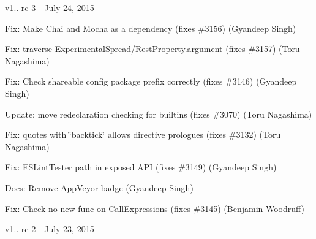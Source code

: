 v1..-\/rc-\/3 -\/ July 24, 2015


\begin{DoxyItemize}
\item Fix\+: Make Chai and Mocha as a dependency (fixes \#3156) (Gyandeep Singh)
\item Fix\+: traverse {\ttfamily Experimental\+Spread/\+Rest\+Property.\+argument} (fixes \#3157) (Toru Nagashima)
\item Fix\+: Check shareable config package prefix correctly (fixes \#3146) (Gyandeep Singh)
\item Update\+: move redeclaration checking for builtins (fixes \#3070) (Toru Nagashima)
\item Fix\+: {\ttfamily quotes} with {\ttfamily \char`\"{}backtick\char`\"{}} allows directive prologues (fixes \#3132) (Toru Nagashima)
\item Fix\+: {\ttfamily E\+S\+Lint\+Tester} path in exposed A\+PI (fixes \#3149) (Gyandeep Singh)
\item Docs\+: Remove App\+Veyor badge (Gyandeep Singh)
\item Fix\+: Check no-\/new-\/func on Call\+Expressions (fixes \#3145) (Benjamin Woodruff)
\end{DoxyItemize}

v1..-\/rc-\/2 -\/ July 23, 2015


